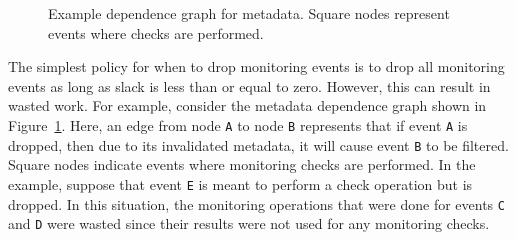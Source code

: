 \begin{figure}
\begin{center}
    \vspace{-0.3in}
    \caption{Example dependence graph for metadata. Square nodes represent
    events where checks are performed.} 
    \label{fig:policies.dataflow_graph}
    \vspace{-0.1in}
  \end{center}
\end{figure}

The simplest policy for when to drop monitoring events is to drop all monitoring events as
long as slack is less than or equal to zero.  However, this can result in
wasted work. For example, consider the metadata dependence graph shown in
Figure~\ref{fig:policies.dataflow_graph}. Here, an edge from node {\tt A} to node
{\tt B} represents that if event {\tt A} is dropped, then due to its
invalidated metadata, it will cause event {\tt B} to be filtered. Square
nodes indicate events where monitoring checks are performed. In the
example, suppose that event {\tt E} is meant to perform a check operation but is dropped.
In this situation, the
monitoring operations that were done for events {\tt C} and {\tt D} were wasted
since their results were not used for any monitoring checks.

